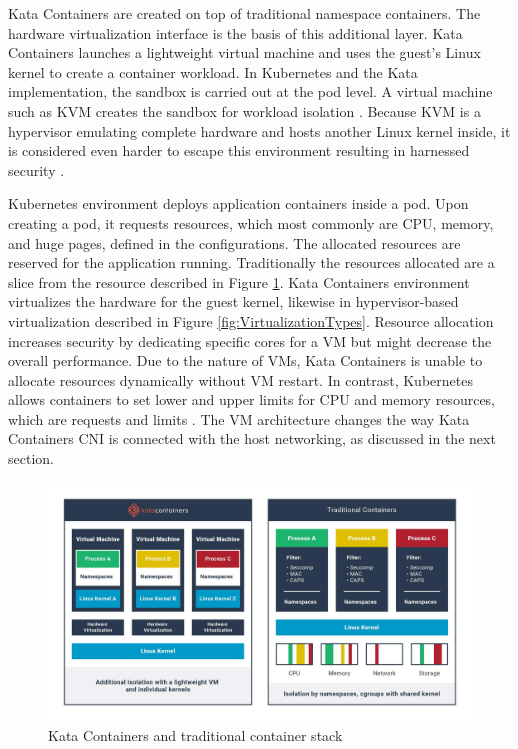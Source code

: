 Kata Containers are created on top of traditional namespace containers. The hardware virtualization interface is the basis of this additional layer. Kata Containers launches a lightweight virtual machine and uses the guest's Linux kernel to create a container workload. In Kubernetes and the Kata implementation, the sandbox is carried out at the pod level. A virtual machine such as KVM creates the sandbox for workload isolation \cite{KataContainersVirtualization}. Because KVM is a hypervisor emulating complete hardware and hosts another Linux kernel inside, it is considered even harder to escape this environment resulting in harnessed security \cite{Eder2016}.

Kubernetes environment deploys application containers inside a pod. Upon creating a pod, it requests resources, which most commonly are CPU, memory, and huge pages, defined in the configurations. The allocated resources are reserved for the application running. Traditionally the resources allocated are a slice from the resource described in Figure \ref{fig:KataContainersStack}. Kata Containers environment virtualizes the hardware for the guest kernel, likewise in hypervisor-based virtualization described in Figure \ref{fig:VirtualizationTypes}. Resource allocation increases security by dedicating specific cores for a VM but might decrease the overall performance. Due to the nature of VMs, Kata Containers is unable to allocate resources dynamically without VM restart. In contrast, Kubernetes allows containers to set lower and upper limits for CPU and memory resources, which are requests and limits \cite{KubernetesContainerResource}. The VM architecture changes the way Kata Containers CNI is connected with the host networking, as discussed in the next section.


\begin{figure}[ht]
  \begin{center}
    \includegraphics[width=13.5cm]{images/KataContainersStack.jpg}
    \caption{Kata Containers and traditional container stack \cite{KataContainers}}
    \label{fig:KataContainersStack}
  \end{center}
\end{figure} 


